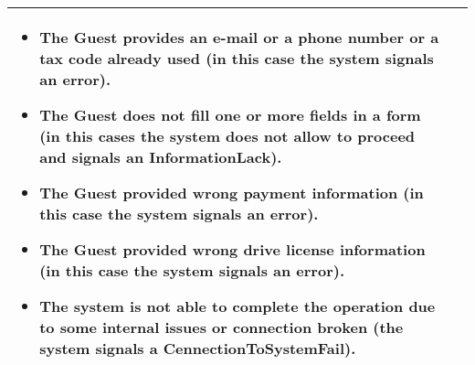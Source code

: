\begin{center}
\begin{tabular}{ l | p{12cm} }
\begin{itemize}
\item The Guest provides an e-mail or a phone number or a tax code already used (in this case the system signals an error).
\item The Guest does not fill one or more fields in a form (in this cases the system does not allow to proceed and signals an InformationLack).
\item The Guest provided wrong payment information (in this case the system signals an error).
\item The Guest provided wrong drive license information (in this case the system signals an error).
\item The system is not able to complete the operation due to some internal issues or connection broken (the system signals a CennectionToSystemFail).%
\end{itemize} \\ \hline
  \end{tabular}
\end{center}
